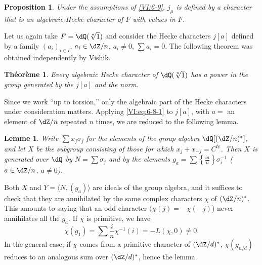 \documentclass[oneside]{book}
\newcounter{char}
\theoremstyle{sga-source}
\theoremstyle{sga-source-dash}
\theoremstyle{sga-source-dotdash}
\theoremstyle{sga-source-number-note-dash}
\theoremstyle{sga-source-note-number-dotdash}
\theoremstyle{sga-source-example-dotdash}
\theoremstyle{sga-source-inline-number}
\theoremstyle{sga-source-bare-number}
\theoremstyle{sga-source}
\newtheorem{lemma_}[subsection]{Lemme}
\newtheorem{theorem_}[subsection]{Théorème}
\newtheorem{proposition_}[subsection]{Proposition}
\newcommand{\PrintPage}[1]{}\newcommand{\MathPage}[1]{}\newcommand{\PrintCite}[2]{#1}\newcommand{\var}[3]{#1}
\begin{document}
\begin{proposition_}\label{VI:6-10}
Under the assumptions of \ref{VI:6-9}, $j_\mu$ is defined by a character 
that is an algebraic Hecke character of $F$ with values in $F$. 
\end{proposition_}

Let us again take $F=\dQ(\sqrt[n]{1})$ and consider the Hecke characters 
$j[a]$ defined by a family $(a_i)_{i\in I}$, $a_i\in \dZ/n$, 
$a_i\ne 0$, $\sum a_i=0$. The following theorem was obtained 
independently by Vishik. 





\begin{theorem_}\label{VI:6-11}
Every algebraic Hecke character of $\dQ(\sqrt[n]{1})$ has a power 
in the group generated by the $j[a]$ and the norm. 
\end{theorem_}

Since we work ``up to torsion,'' only the algebraic part of the 
Hecke characters under consideration matters. Applying \eqref{VI:eq:6-8-1} to 
$j[a]$, with $a=$ an element of $\dZ/n$ repeated $n$ times, we 
are reduced to the following lemma.





\begin{lemma_}\label{VI:6-12}
Write $\sum x_j \sigma_j$ for the elements of the group algebra 
  $\dQ[(\dZ/n)^\ast]$, and let $X$ be the subgroup consisting of those for which 
$x_j+x_{-j}=C^{\underline{t e}}$. Then $X$ is generated over $\dQ$ by 
$N=\sum \sigma_j$ and by the elements 
  $g_a=\sum \left\{ \frac{i a}{n}\right\} \sigma_i^{-1}$ 
($a\in \dZ/n$, $a\ne 0$). 
\end{lemma_}

\PrintPage{218}
Both $X$ and $Y=\langle N,(g_a)\rangle$ are ideals of the group 
algebra, and it suffices to check that they are annihilated by the same 
complex characters $\chi$ of $(\dZ/n)^\ast$. This amounts to saying that an odd character $(\chi(j)=-\chi(-j)$) never annihilates all the $g_a$. If 
$\chi$ is primitive, we have 
\[
  \chi(g_1) = \sum \frac i n \chi^{-1}(i) = -L(\chi,0)\ne 0 \text{.} 
\]
In the general case, if $\chi$ comes from a primitive character of 
  $(\dZ/d)^\ast$, $\chi(g_{n/d})$ reduces to an analogous sum over 
  $(\dZ/d)^\ast$, hence the lemma. 
\end{document}
